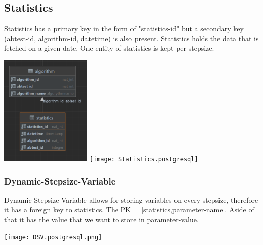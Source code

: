 \documentclass[a4paper,12pt]{article}
\begin{document}
	\subsection{Statistics}
	Statistics has a primary key in the form of "statistics-id" but a secondary key (abtest-id, algorithm-id, datetime) is also present. Statistics holds the data that is fetched on a given date. One entity of statistics is kept per stepsize.
	\begin{center}
	
		\includegraphics[height={200px},width=\textwidth,keepaspectratio]{Statistics.png}
		\texttt{[image: Statistics.postgresql]}
	\end{center}
\subsubsection{Dynamic-Stepsize-Variable}
	Dynamic-Stepsize-Variable allows for storing variables on every stepsize, therefore it has a foreign key to statistics. The PK = [statistics,parameter-name]. Aside of that it has the value that we want to store in parameter-value.
	\begin{center}
		\texttt{[image: DSV.postgresql.png]}
	
	\end{center}
\end{document}
